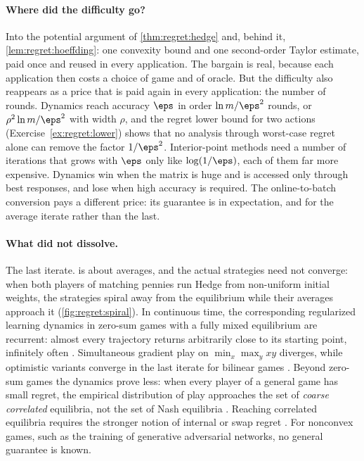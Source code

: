 \begin{refsection}
\paragraph{Where did the difficulty go?} Into the potential argument of \cref{thm:regret:hedge} and, behind it, \cref{lem:regret:hoeffding}: one convexity bound and one second-order Taylor estimate, paid once and reused in every application. The bargain is real, because each application then costs a choice of game and of oracle. But the difficulty also reappears as a price that is paid again in every application: the number of rounds. Dynamics reach accuracy $\eps$ in order $\ln m/\eps^2$ rounds, or $\rho^2\ln m/\eps^2$ with width $\rho$, and the regret lower bound for two actions (Exercise~\ref{ex:regret:lower}) shows that no analysis through worst-case regret alone can remove the factor $1/\eps^2$. Interior-point methods need a number of iterations that grows with $\eps$ only like $\log(1/\eps)$, each of them far more expensive. Dynamics win when the matrix is huge and is accessed only through best responses, and lose when high accuracy is required. The online-to-batch conversion pays a different price: its guarantee is in expectation, and for the average iterate rather than the last.

\paragraph{What did not dissolve.} The last iterate.  is about averages, and the actual strategies need not converge: when both players of matching pennies run Hedge from non-uniform initial weights, the strategies spiral away from the equilibrium while their averages approach it (\cref{fig:regret:spiral}). In continuous time, the corresponding regularized learning dynamics in zero-sum games with a fully mixed equilibrium are recurrent: almost every trajectory returns arbitrarily close to its starting point, infinitely often \parencite{MertikopoulosPapadimitriouPiliouras2018}. Simultaneous gradient play on $\min_x\max_yxy$ diverges, while optimistic variants converge in the last iterate for bilinear games \parencite{DaskalakisIlyasSyrgkanisZeng2018}. Beyond zero-sum games the dynamics prove less: when every player of a general game has small regret, the empirical distribution of play approaches the set of \emph{coarse correlated} equilibria, not the set of Nash equilibria \parencite{CesaBianchiLugosi2006}. Reaching correlated equilibria requires the stronger notion of internal or swap regret \parencite{HartMasColell2000}. For nonconvex games, such as the training of generative adversarial networks, no general guarantee is known.


\end{refsection}
